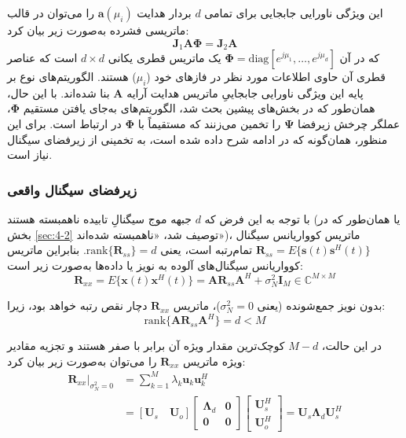 این ویژگی ناورایی جابجایی برای تمامی $d$ بردار هدایت $\bm{a}(\mu_i)$ را می‌توان در قالب ماتریسی فشرده به‌صورت زیر بیان کرد:
\begin{equation}
	\bm{J}_1 \bm{A} \bm{\Phi} = \bm{J}_2 \bm{A}
	\label{eq:5-12}
\end{equation}
که در آن $\bm{\Phi} = \text{diag}[e^{j\mu_1}, \dots, e^{j\mu_d}]$ یک ماتریس قطری یکانی $d \times d$ است که عناصر قطری آن حاوی اطلاعات مورد نظر  در فازهای خود ($\mu_i$) هستند. الگوریتم‌های نوع  بر پایه این ویژگی ناورایی جابجاییِ ماتریس هدایت آرایه $\bm{A}$ بنا شده‌اند. با این حال، همان‌طور که در بخش‌های پیشین بحث شد، الگوریتم‌های  به‌جای یافتن مستقیم $\bm{\Phi}$، عملگر چرخش زیرفضا $\bm{\Psi}$ را تخمین می‌زنند که مستقیماً با $\bm{\Phi}$ در ارتباط است. برای این منظور، همان‌گونه که در ادامه شرح داده شده است، به تخمینی از زیرفضای سیگنال نیاز است.



\subsubsection{زیرفضای سیگنال واقعی}
\label{subsec:5-3-1-1}
با توجه به این فرض که $d$ جبهه موج سیگنالِ تابیده ناهمبسته هستند (یا همان‌طور که در بخش \ref{sec:4-2} توصیف شد، «ناهمبسته شده‌اند»)، ماتریس کوواریانس سیگنال $\bm{R}_{ss} = E\{\bm{s}(t)\bm{s}^H(t)\}$ تمام‌رتبه است، یعنی $\text{rank}\{\bm{R}_{ss}\} = d$. بنابراین ماتریس کوواریانس سیگنال‌های آلوده به نویز یا داده‌ها \cite{5-4} به‌صورت زیر است:
\begin{equation}
	\bm{R}_{xx} = E\{\bm{x}(t)\bm{x}^H(t)\} = \bm{A}\bm{R}_{ss}\bm{A}^H + \sigma_N^2 \bm{I}_M \in \mathbb{C}^{M \times M}
	\label{eq:5-13}
\end{equation}

بدون نویز جمع‌شونده (یعنی $\sigma_N^2 = 0$)، ماتریس $\bm{R}_{xx}$ دچار نقص رتبه خواهد بود، زیرا:
\begin{equation}
	\text{rank}\{\bm{A}\bm{R}_{ss}\bm{A}^H\} = d < M
	\label{eq:5-14}
\end{equation}

در این حالت، $M - d$ کوچک‌ترین مقدار ویژه آن برابر با صفر هستند و تجزیه مقادیر ویژه ماتریس $\bm{R}_{xx}$ را می‌توان به‌صورت زیر بیان کرد:
\begin{align}
	\bm{R}_{xx} \big|_{\sigma_N^2=0} &= \sum_{k=1}^{M} \lambda_k \bm{u}_k \bm{u}_k^H \nonumber \\
	&= [\bm{U}_s \quad \bm{U}_o] 
	\begin{bmatrix} 
		\bm{\Lambda}_d & \bm{0} \\
		\bm{0} & \bm{0}
	\end{bmatrix} 
	\begin{bmatrix} 
		\bm{U}_s^H \\ 
		\bm{U}_o^H 
	\end{bmatrix} = \bm{U}_s \bm{\Lambda}_d \bm{U}_s^H
	\label{eq:5-15}
\end{align}


